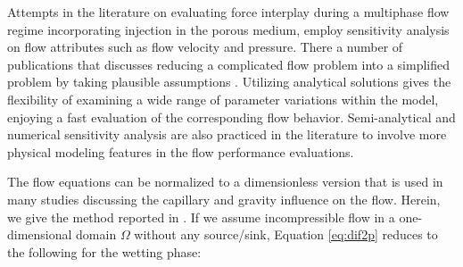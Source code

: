 Attempts in the literature on evaluating force interplay during a multiphase
flow regime incorporating injection in the porous medium, employ sensitivity
analysis on flow attributes such as flow velocity and pressure. There a number of publications that discusses reducing a complicated flow problem into a simplified problem by taking plausible assumptions \cite{fayers1959effect,dong1999effect,nordbotten2005injection,
yortsos1983analytical,rapoport1953properties,farajzadeh2011analytical,
yang1992analytical,chen1990integral,bentsen1993effect}. Utilizing analytical
solutions gives the flexibility of examining a wide range of parameter
variations within the model, enjoying a fast evaluation of the
corresponding flow behavior. Semi-analytical and numerical sensitivity analysis
are also practiced in the literature to involve more physical modeling
features in the flow performance
evaluations\cite{rosado2007analysis,allen1986theoretical,alkan2010impact}.


The flow equations can be normalized to a dimensionless version that is used in
many studies discussing the capillary and gravity influence on the flow.
Herein, we give the method reported in \cite{fayers1959effect}. If we assume incompressible flow in a one-dimensional domain $\Omega$
without any source/sink, Equation \ref{eq:dif2p} reduces to the following for
the wetting phase:

